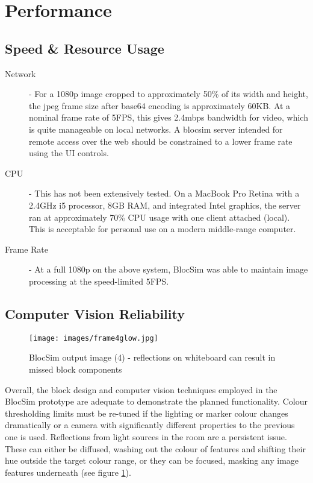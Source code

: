 \newpage

\section{Performance}

\subsection{Speed \& Resource Usage}

\begin{description}
	\item[Network] - For a 1080p image cropped to approximately 50\% of its width and height, the jpeg frame size after base64 encoding is approximately 60KB. At a nominal frame rate of 5FPS, this gives 2.4mbps bandwidth for video, which is quite manageable on local networks. A blocsim server intended for remote access over the web should be constrained to a lower frame rate using the UI controls.
	\item[CPU] - This has not been extensively tested. On a MacBook Pro Retina with a 2.4GHz i5 processor, 8GB RAM, and integrated Intel graphics, the server ran at approximately 70\% CPU usage with one client attached (local). This is acceptable for personal use on a modern middle-range computer. 
	\item[Frame Rate] - At a full 1080p on the above system, BlocSim was able to maintain image processing at the speed-limited 5FPS.
\end{description}

\newpage

\subsection{Computer Vision Reliability}

\begin{figure}[ht!]
\centering
\texttt{[image: images/frame4glow.jpg]}
\caption{BlocSim output image (4) - reflections on whiteboard can result in missed block components}
\label{im:frame4glow}
\end{figure}

Overall, the block design and computer vision techniques employed in the BlocSim prototype are adequate to demonstrate the planned functionality. Colour thresholding limits must be re-tuned if the lighting or marker colour changes dramatically or a camera with significantly different properties to the previous one is used. Reflections from light sources in the room are a persistent issue. These can either be diffused, washing out the colour of features and shifting their hue outside the target colour range, or they can be focused, masking any image features underneath (see figure \ref{im:frame4glow}).

